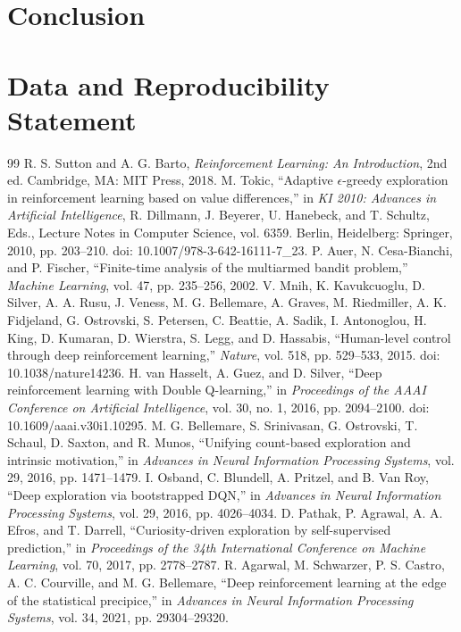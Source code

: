 \documentclass[preprint,12pt]{elsarticle}
\begin{document}
\section{Conclusion}


\section*{Data and Reproducibility Statement}

\begin{thebibliography}{99}
 R. S. Sutton and A. G. Barto, \emph{Reinforcement Learning: An Introduction}, 2nd ed. Cambridge, MA: MIT Press, 2018.
 M. Tokic, ``Adaptive $\epsilon$-greedy exploration in reinforcement learning based on value differences,'' in \emph{KI 2010: Advances in Artificial Intelligence}, R. Dillmann, J. Beyerer, U. Hanebeck, and T. Schultz, Eds., Lecture Notes in Computer Science, vol. 6359. Berlin, Heidelberg: Springer, 2010, pp. 203--210. doi: 10.1007/978-3-642-16111-7\_23.
 P. Auer, N. Cesa-Bianchi, and P. Fischer, ``Finite-time analysis of the multiarmed bandit problem,'' \emph{Machine Learning}, vol. 47, pp. 235--256, 2002.
 V. Mnih, K. Kavukcuoglu, D. Silver, A. A. Rusu, J. Veness, M. G. Bellemare, A. Graves, M. Riedmiller, A. K. Fidjeland, G. Ostrovski, S. Petersen, C. Beattie, A. Sadik, I. Antonoglou, H. King, D. Kumaran, D. Wierstra, S. Legg, and D. Hassabis, ``Human-level control through deep reinforcement learning,'' \emph{Nature}, vol. 518, pp. 529--533, 2015. doi: 10.1038/nature14236.
 H. van Hasselt, A. Guez, and D. Silver, ``Deep reinforcement learning with Double Q-learning,'' in \emph{Proceedings of the AAAI Conference on Artificial Intelligence}, vol. 30, no. 1, 2016, pp. 2094--2100. doi: 10.1609/aaai.v30i1.10295.
 M. G. Bellemare, S. Srinivasan, G. Ostrovski, T. Schaul, D. Saxton, and R. Munos, ``Unifying count-based exploration and intrinsic motivation,'' in \emph{Advances in Neural Information Processing Systems}, vol. 29, 2016, pp. 1471--1479.
 I. Osband, C. Blundell, A. Pritzel, and B. Van Roy, ``Deep exploration via bootstrapped DQN,'' in \emph{Advances in Neural Information Processing Systems}, vol. 29, 2016, pp. 4026--4034.
 D. Pathak, P. Agrawal, A. A. Efros, and T. Darrell, ``Curiosity-driven exploration by self-supervised prediction,'' in \emph{Proceedings of the 34th International Conference on Machine Learning}, vol. 70, 2017, pp. 2778--2787.
 R. Agarwal, M. Schwarzer, P. S. Castro, A. C. Courville, and M. G. Bellemare, ``Deep reinforcement learning at the edge of the statistical precipice,'' in \emph{Advances in Neural Information Processing Systems}, vol. 34, 2021, pp. 29304--29320.
\end{thebibliography}
\end{document}
